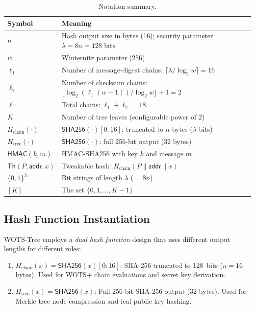 \documentclass[11pt,a4paper]{article}
\theoremstyle{definition}
\begin{document}
\begin{table}[h]
\centering
\begin{tabular}{@{}ll@{}}
\toprule
\textbf{Symbol} & \textbf{Meaning} \\
\midrule
$n$ & Hash output size in bytes (16); security parameter $\lambda = 8n = 128$ bits \\
$w$ & Winternitz parameter (256) \\
$\ell_1$ & Number of message-digest chains: $\lceil \lambda / \log_2 w \rceil = 16$ \\
$\ell_2$ & Number of checksum chains: $\lfloor \log_2(\ell_1(w-1)) / \log_2 w \rfloor + 1 = 2$ \\
$\ell$ & Total chains: $\ell_1 + \ell_2 = 18$ \\
$K$ & Number of tree leaves (configurable power of 2) \\
$H_{\mathrm{chain}}(\cdot)$ & $\mathsf{SHA256}(\cdot)[0{:}16]$: truncated to $n$ bytes ($\lambda$ bits) \\
$H_{\mathrm{tree}}(\cdot)$ & $\mathsf{SHA256}(\cdot)$: full 256-bit output (32 bytes) \\
$\mathsf{HMAC}(k,m)$ & HMAC-SHA256 with key $k$ and message $m$ \\
$\mathsf{Th}(P, \mathsf{addr}, x)$ & Tweakable hash: $H_{\mathrm{chain}}(P \| \mathsf{addr} \| x)$ \\
$\{0,1\}^\lambda$ & Bit strings of length $\lambda$ ($= 8n$) \\
$[K]$ & The set $\{0, 1, \ldots, K-1\}$ \\
\bottomrule
\end{tabular}
\caption{Notation summary.}
\label{tab:notation}
\end{table}

\subsection{Hash Function Instantiation}
\label{sec:hash-instantiation}

WOTS-Tree employs a \emph{dual hash function} design that uses different output lengths for different roles:

\begin{enumerate}[nosep]
    \item $H_{\mathrm{chain}}(x) = \mathsf{SHA256}(x)[0{:}16]$: SHA-256 truncated to 128~bits ($n = 16$ bytes). Used for WOTS+ chain evaluations and secret key derivation.
    \item $H_{\mathrm{tree}}(x) = \mathsf{SHA256}(x)$: Full 256-bit SHA-256 output (32 bytes). Used for Merkle tree node compression and leaf public key hashing.
\end{enumerate}
\end{document}
